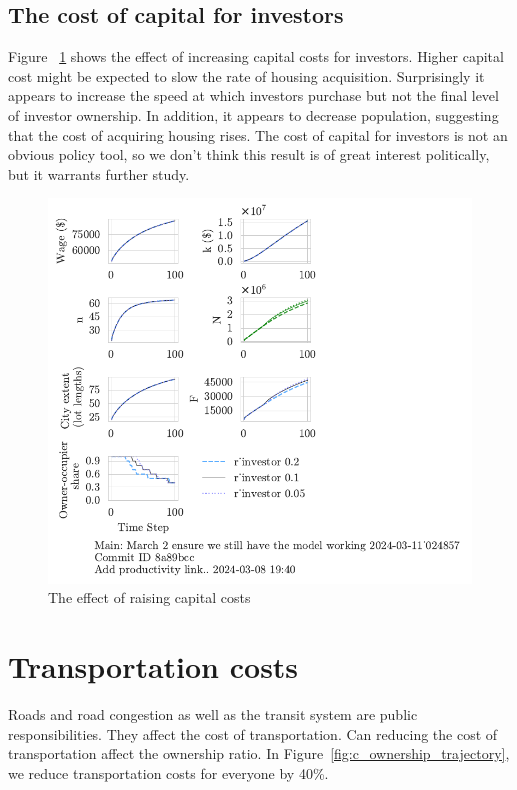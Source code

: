 \subsection{The cost of capital for investors}
Figure ~\ref{fig:capital_ownership_trajectory} shows the effect of increasing capital costs for investors. Higher capital cost might be expected to slow the rate of housing acquisition. Surprisingly it appears to increase the speed at which investors purchase but not the final level of investor ownership.  In addition, it appears to decrease population, suggesting that the cost of acquiring housing rises. The cost of capital for investors is not an obvious policy tool, so we don't think this result is of great interest politically, but it warrants further study.
\begin{figure}[h!t]
    \centering
    \includegraphics[scale=.8, trim={0 1.4cm 0 0},clip]{fig/r_investor-Main-024857.pdf}
    \caption{The effect of raising capital costs}
    \label{fig:capital_ownership_trajectory}
\end{figure}

\newpage
\section{Transportation costs}
Roads and road congestion as well as the transit system are public responsibilities. They affect the cost of transportation. Can reducing the cost of transportation affect the ownership ratio. In Figure~\ref{fig:c_ownership_trajectory}, we reduce transportation costs for everyone by 40\%. 

